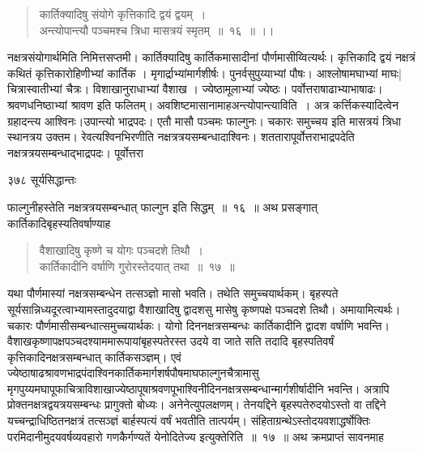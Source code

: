 \documentclass[11pt, openany]{book}
\begin{document}

\begin{quote}
{\ssi कार्तिक्यादिषु संयोगे कृत्तिकादि द्वयं द्वयम्~।\\
अन्त्योपान्त्यौ पञ्चमश्च त्रिधा मासत्रयं स्मृतम्~॥~१६~॥ ।। }
\end{quote}
 नक्षत्रसंयोगार्थमिति निमित्तसप्तमी। कार्तिक्यादिषु कार्तिकमासादीनां पौर्णमासीय्वित्यर्थः। कृत्तिकादि द्वयं नक्षत्रं कथितं कृत्तिकारोहिणीभ्यां कार्तिक । मृगार्द्राभ्यांमार्गशीर्षः। पुनर्वसुपुय्याभ्यां पौषः। आश्लोषामघाभ्यां माघः|चित्रास्वातीभ्यां चैत्रः। विशाखानुराधाभ्यां वैशाख । ज्येष्ठामूलाभ्यां ज्येष्ठः। पर्वोत्तराषाढाभ्याभाषाढः। श्रवणधनिष्ठाभ्यां श्रावण इति फलितम्। अवशिष्टमासानामाह\textendash अन्त्योपान्त्याविति~। अत्र कर्त्तिकस्यादित्वेन ग्रहादन्त्य आश्विनः।उपान्त्यो भाद्रपदः। एतौ मासौ पञ्चमः फाल्गुनः। चकारः समुच्चय इति मासत्रयं त्रिधा स्थानत्रय उक्तम। रेवत्यश्विनभिरणीति नक्षत्रत्रयसम्बन्धादाश्विनः। शततारापूर्वोत्तराभाद्रपदेति नक्षत्रत्रयसम्बन्धाद्भाद्रपदः। पूर्वोत्तरा \textendash



\newpage


\noindent ३७८ \hspace{4cm} सूर्यसिद्धान्तः
\vspace{1cm}


\noindent फाल्गुनीहस्तेति नक्षत्रत्रयसम्बन्धात् फाल्गुन इति सिद्धम्~॥~१६~॥ 
अथ प्रसङ्गात् कार्तिकादिबृहस्यतिवर्षाण्याह \textendash


 \begin{quote}
{\ssi वैशाखादिषु कृष्णे च योगः पञ्चदशे तिथौ~।\\
कार्तिकादीनि वर्षाणि गुरोरस्तेदयात् तथा~॥~१७~॥ }
\end{quote}

 यथा पौर्णमास्यां नक्षत्रसम्बन्धेन तत्सञ्ज्ञो मासो भवति।
तथेति समुच्चयार्थकम्। बृहस्पते सूर्यसान्निध्यदूरत्वाभ्यामस्तादुदयाद्वा वैशाखादिषु द्वादशसु मासेषु कृष्णपक्षे पञ्चदशे तिथौ। अमायामित्यर्थः। चकारः पौर्णमासीसम्बन्धात्समुच्चयार्थकः। योगो दिननक्षत्रसम्बन्धः कार्तिकादीनि द्वादश वर्षाणि भवन्ति। वैशाखकृष्णापक्षपञ्चदश्याममारूपायांबृहस्पतेरस्त उदये वा जाते सति तदादि बृहस्पतिवर्षं कृत्तिकादिनक्षत्रसम्बन्धात् कार्तिकसञ्ज्ञम्। एवं ज्येष्ठाषाढश्रावणभाद्रपंदाश्विनकार्तिकमार्गशर्षपौषमाघफाल्गुनचैत्रामासु मृगपुय्यमघापूफाचित्राविशाखाज्येष्ठापूषाश्रवणपूभाश्विनीदिननक्षत्रसम्बन्धान्मार्गशीर्षादीनि भवन्ति। अत्रापि प्रोक्तनक्षत्रद्वयत्रयसम्बन्धः प्रागुक्तो बोध्यः। अनेनेत्युपलक्षणम्। तेनयद्दिने बृहस्पतेरुदयोऽस्तो वा तद्दिने यच्चन्द्राधिष्ठितनक्षत्रं तत्सञ्ज्ञं बार्हस्पत्यं वर्षं भवतीति तात्पर्यम्। संहिताग्रन्थेऽस्तोदयवशाद्धर्षोक्तिः परमिदानीमुदयवर्षव्यवहारो गणकैर्गण्यतें येनोदितेज्य इत्युक्तेरिति~॥~१७~॥
\noindent अथ क्रमप्राप्तं सावनमाह\textendash
\end{document}
